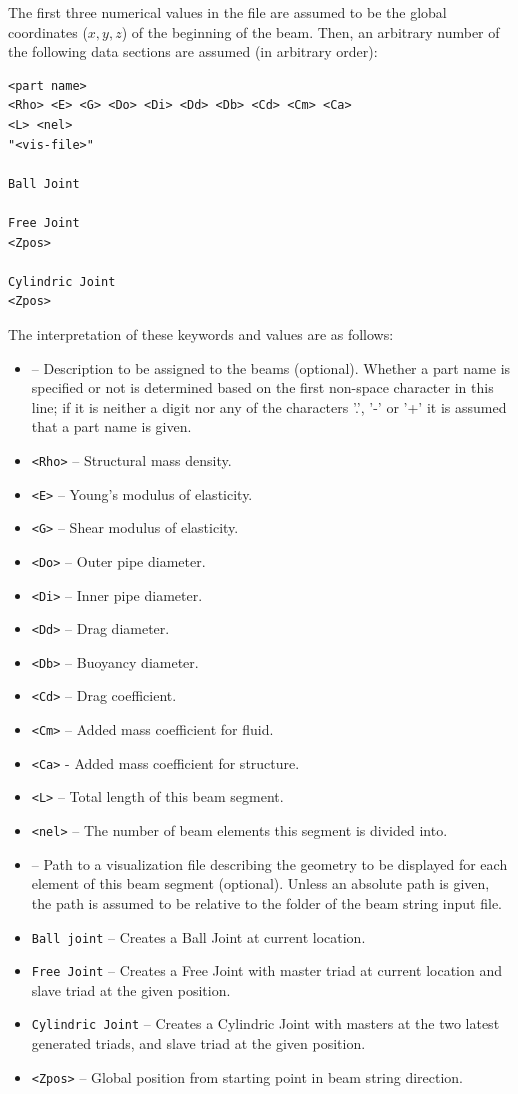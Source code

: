 The first three numerical values in the file are assumed to be the global
coordinates ($x, y, z$) of the beginning of the beam.
Then, an arbitrary number of the following data sections are assumed
(in arbitrary order):
%
\begin{center}
\baselineskip
\begin{minipage}{0.9\textwidth}
\begin{verbatim}
<part name>
<Rho> <E> <G> <Do> <Di> <Dd> <Db> <Cd> <Cm> <Ca>
<L> <nel>
"<vis-file>"

Ball Joint

Free Joint
<Zpos>

Cylindric Joint
<Zpos>
\end{verbatim}
\end{minipage}
\baselineskip
\end{center}
%
The interpretation of these keywords and values are as follows:
%
\begin{itemize}
\item{\tt<part name>} -- Description to be assigned to the beams (optional).
  Whether a part name is specified or not is determined based on the first
  non-space character in this line; if it is neither a digit nor any of the
  characters '.', '-' or '+' it is assumed that a part name is given.
\item{\tt<Rho>} -- Structural mass density.
\item{\tt<E>} -- Young's modulus of elasticity.
\item{\tt<G>} -- Shear modulus of elasticity.
\item{\tt<Do>} -- Outer pipe diameter.
\item{\tt<Di>} -- Inner pipe diameter.
\item{\tt<Dd>} -- Drag diameter.
\item{\tt<Db>} -- Buoyancy diameter.
\item{\tt<Cd>} -- Drag coefficient.
\item{\tt<Cm>} -- Added mass coefficient for fluid.
\item{\tt<Ca>} - Added mass coefficient for structure.
\item{\tt<L>} -- Total length of this beam segment.
\item{\tt<nel>} -- The number of beam elements this segment is divided into.
\item{\tt<vis-file>} -- Path to a visualization file describing
  the geometry to be displayed for each element of this beam segment (optional).
  Unless an absolute path is given, the path is assumed to be relative to the
  folder of the beam string input file.
\item{\tt Ball joint} -- Creates a Ball Joint at current location.
\item{\tt Free Joint} -- Creates a Free Joint with master triad at
 current location and slave triad at the given position.
\item{\tt Cylindric Joint} -- Creates a Cylindric Joint with masters at the two
  latest generated triads, and slave triad at the given position.
\item{\tt<Zpos>} --
  Global position from starting point in beam string direction.
\end{itemize}

